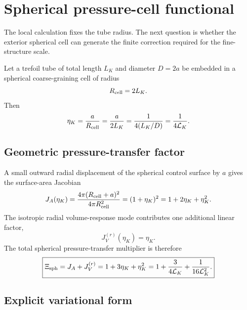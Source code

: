 \documentclass[11pt]{article}
\newcommand{\LK}{\mathcal L_K}
\newcommand{\Xisph}{\Xi_{\rm sph}}
\begin{document}
\section{Spherical pressure-cell functional}
\label{sec:spherical}

The local calculation fixes the tube radius.  The next question is whether the exterior
spherical cell can generate the finite correction required for the fine-structure scale.

Let a trefoil tube of total length \(L_K\) and diameter \(D=2a\) be embedded in a spherical
coarse-graining cell of radius
\begin{equation}
  R_{\rm cell}=2L_K.
  \label{eq:Rcell}
\end{equation}
Then
\begin{equation}
  \eta_K
  =
  \frac{a}{R_{\rm cell}}
  =
  \frac{a}{2L_K}
  =
  \frac{1}{4(L_K/D)}
  =
  \frac{1}{4\LK}.
  \label{eq:eta}
\end{equation}

\subsection{Geometric pressure-transfer factor}

A small outward radial displacement of the spherical control surface by \(a\) gives the
surface-area Jacobian
\begin{equation}
  J_A(\eta_K)
  =
  \frac{4\pi(R_{\rm cell}+a)^2}{4\pi R_{\rm cell}^2}
  =
  (1+\eta_K)^2
  =
  1+2\eta_K+\eta_K^2.
  \label{eq:JA}
\end{equation}
The isotropic radial volume-response mode contributes one additional linear factor,
\begin{equation}
  J_V^{(r)}(\eta_K)=\eta_K.
  \label{eq:JV}
\end{equation}
The total spherical pressure-transfer multiplier is therefore
\begin{equation}
  \boxed{
  \Xisph
  =
  J_A+J_V^{(r)}
  =
  1+3\eta_K+\eta_K^2
  =
  1+\frac{3}{4\LK}+\frac{1}{16\LK^2}.
  }
  \label{eq:Xi}
\end{equation}

\subsection{Explicit variational form}
\end{document}
